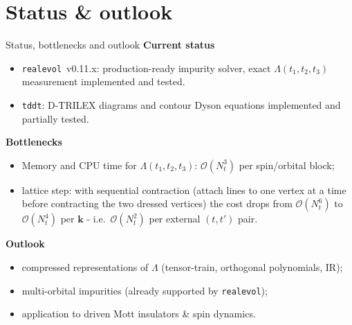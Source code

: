 \documentclass[10pt,aspectratio=169]{beamer}
\newcommand{\realevol}{\texttt{realevol}}
\newcommand{\tddt}{\texttt{tddt}}
\begin{document}
\section{Status \& outlook}

\begin{frame}{Status, bottlenecks and outlook}
    \textbf{Current status}
    \begin{itemize}
        \item \realevol\ v0.11.x: production-ready impurity solver, exact
        $\Lambda(t_1,t_2,t_3)$ measurement implemented and tested.
        \item \tddt: D-TRILEX diagrams and contour Dyson equations implemented and partially tested.
    \end{itemize}

    \medskip
    \textbf{Bottlenecks}
    \begin{itemize}
        \item Memory and CPU time for $\Lambda(t_1,t_2,t_3)$: $\mathcal{O}(N_t^3)$
        per spin/orbital block;
        \item lattice step: with sequential contraction (attach lines to
        one vertex at a time before contracting the two dressed
        vertices) the cost drops from $\mathcal{O}(N_t^6)$ to
        $\mathcal{O}(N_t^4)$ per $\bm k$ - i.e.\
        $\mathcal{O}(N_t^2)$ per external $(t,t')$ pair.
    \end{itemize}

    \medskip
    \textbf{Outlook}
    \begin{itemize}
        \item compressed representations of $\Lambda$ (tensor-train, orthogonal polynomials, IR);
        \item multi-orbital impurities (already supported by \realevol);
        \item application to driven Mott insulators \& spin dynamics.
    \end{itemize}
\end{frame}
\end{document}
